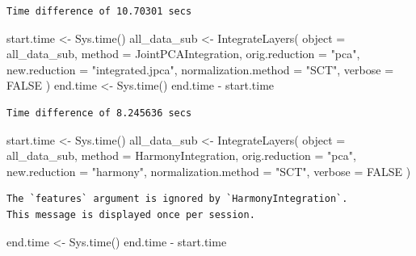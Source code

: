 \documentclass[
  letterpaper,
  DIV=11,
  numbers=noendperiod]{scrreprt}
\newenvironment{Shaded}{\begin{snugshade}}{\end{snugshade}}
\newcommand{\AttributeTok}[1]{\textcolor[rgb]{0.40,0.45,0.13}{#1}}
\newcommand{\ConstantTok}[1]{\textcolor[rgb]{0.56,0.35,0.01}{#1}}
\newcommand{\FunctionTok}[1]{\textcolor[rgb]{0.28,0.35,0.67}{#1}}
\newcommand{\NormalTok}[1]{\textcolor[rgb]{0.00,0.23,0.31}{#1}}
\newcommand{\OtherTok}[1]{\textcolor[rgb]{0.00,0.23,0.31}{#1}}
\newcommand{\SpecialCharTok}[1]{\textcolor[rgb]{0.37,0.37,0.37}{#1}}
\newcommand{\StringTok}[1]{\textcolor[rgb]{0.13,0.47,0.30}{#1}}
\begin{document}
\begin{verbatim}
Time difference of 10.70301 secs
\end{verbatim}

\begin{Shaded}
\begin{Highlighting}[]
\NormalTok{start.time }\OtherTok{\textless{}{-}} \FunctionTok{Sys.time}\NormalTok{()}
\NormalTok{all\_data\_sub }\OtherTok{\textless{}{-}} \FunctionTok{IntegrateLayers}\NormalTok{(}
  \AttributeTok{object =}\NormalTok{ all\_data\_sub, }\AttributeTok{method =}\NormalTok{ JointPCAIntegration,}
  \AttributeTok{orig.reduction =} \StringTok{"pca"}\NormalTok{, }\AttributeTok{new.reduction =} \StringTok{"integrated.jpca"}\NormalTok{, }\AttributeTok{normalization.method =} \StringTok{"SCT"}\NormalTok{,}
  \AttributeTok{verbose =} \ConstantTok{FALSE}
\NormalTok{)}
\NormalTok{end.time }\OtherTok{\textless{}{-}} \FunctionTok{Sys.time}\NormalTok{()}
\NormalTok{end.time }\SpecialCharTok{{-}}\NormalTok{ start.time}
\end{Highlighting}
\end{Shaded}

\begin{verbatim}
Time difference of 8.245636 secs
\end{verbatim}

\begin{Shaded}
\begin{Highlighting}[]
\NormalTok{start.time }\OtherTok{\textless{}{-}} \FunctionTok{Sys.time}\NormalTok{()}
\NormalTok{all\_data\_sub }\OtherTok{\textless{}{-}} \FunctionTok{IntegrateLayers}\NormalTok{(}
  \AttributeTok{object =}\NormalTok{ all\_data\_sub, }\AttributeTok{method =}\NormalTok{ HarmonyIntegration,}
  \AttributeTok{orig.reduction =} \StringTok{"pca"}\NormalTok{, }\AttributeTok{new.reduction =} \StringTok{"harmony"}\NormalTok{, }\AttributeTok{normalization.method =} \StringTok{"SCT"}\NormalTok{,}
  \AttributeTok{verbose =} \ConstantTok{FALSE}
\NormalTok{)}
\end{Highlighting}
\end{Shaded}

\begin{verbatim}
The `features` argument is ignored by `HarmonyIntegration`.
This message is displayed once per session.
\end{verbatim}

\begin{Shaded}
\begin{Highlighting}[]
\NormalTok{end.time }\OtherTok{\textless{}{-}} \FunctionTok{Sys.time}\NormalTok{()}
\NormalTok{end.time }\SpecialCharTok{{-}}\NormalTok{ start.time}
\end{Highlighting}
\end{Shaded}
\end{document}

